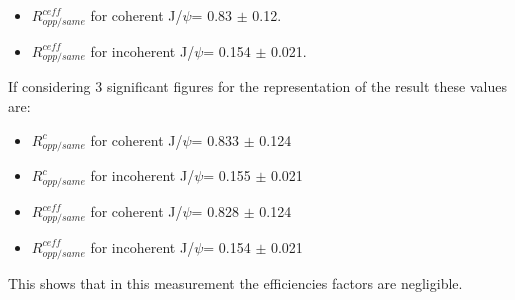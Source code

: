     \begin{itemize}
      \item $ R_{opp/same}^{ceff}$ for coherent J/$\psi$= 0.83 $\pm$ 0.12.
      \item $ R_{opp/same}^{ceff} $ for incoherent J/$\psi$= 0.154 $\pm$ 0.021.
    \end{itemize}
    
    If considering 3 significant figures for the representation of the result these
      values are: 
    \begin{itemize}
      \item $ R_{opp/same}^{c}$ for coherent J/$\psi$= 0.833 $\pm$ 0.124
      \item $ R_{opp/same}^{c}$ for incoherent J/$\psi$= 0.155 $\pm$ 0.021
      \item $ R_{opp/same}^{ceff}$ for coherent J/$\psi$= 0.828 $\pm$ 0.124
      \item $ R_{opp/same}^{ceff} $ for incoherent J/$\psi$= 0.154 $\pm$ 0.021
    \end{itemize}
    
    This shows that in this measurement the efficiencies factors are negligible. 
